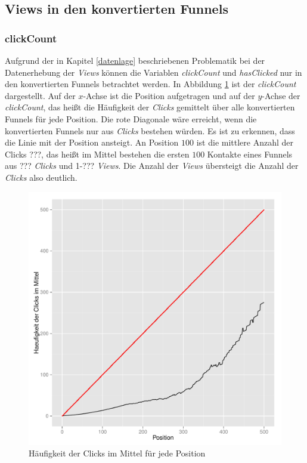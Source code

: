 \subsection{Views in den konvertierten Funnels}

\subsubsection*{clickCount}
Aufgrund der in Kapitel \ref{datenlage} beschriebenen Problematik bei der Datenerhebung der \textit{Views} können die Variablen \textit{clickCount} und \textit{hasClicked} nur in den konvertierten Funnels betrachtet werden. In Abbildung \ref{clickCount} ist der \textit{clickCount} dargestellt. Auf der $x$-Achse ist die Position aufgetragen und auf der $y$-Achse der \textit{clickCount}, das heißt die Häufigkeit der \textit{Clicks} gemittelt über alle konvertierten Funnels für jede Position. Die rote Diagonale wäre erreicht, wenn die konvertierten Funnels nur aus \textit{Clicks} bestehen würden. Es ist zu erkennen, dass die Linie mit der Position ansteigt. An Position $100$ ist die mittlere Anzahl der Clicks ???, das heißt im Mittel bestehen die ersten $100$ Kontakte eines Funnels aus ??? \textit{Clicks} und 1-??? \textit{Views}. Die Anzahl der \textit{Views} übersteigt die Anzahl der \textit{Clicks} also deutlich.
\begin{figure}[H]
    \centering
    \includegraphics[scale=0.5]{clickCountSucc.pdf}
    \caption{Häufigkeit der Clicks im Mittel für jede Position}
    \label{clickCount}
\end{figure}

